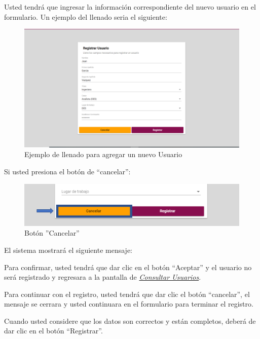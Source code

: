             Usted tendrá que ingresar la información correspondiente del nuevo usuario en el formulario. Un ejemplo del llenado seria el siguiente:
        
            \begin{figure}[!hbtp]
                \centering
                \hypertarget{ejreg}{\includegraphics[width=0.7\linewidth]{images/SP5/Registro-Usuario-Des}}
                \caption{Ejemplo de llenado para agregar un nuevo Usuario}
                \label{ejreg}
            \end{figure}
    
    \newpage
            Si usted presiona el botón de “cancelar”: 
            
            \begin{figure}[!hbtp]
                \centering
                \hypertarget{cancel1}{\includegraphics[width=0.7\linewidth]{images/SP5/BtnCancelar1}}
                \caption{Botón ''Cancelar''}
                \label{cancel1}
            \end{figure}
            
            El sistema mostrará el siguiente mensaje:

        
            Para confirmar, usted tendrá que dar clic en el botón “Aceptar” y el usuario no será registrado y regresara a la pantalla de \hyperlink{consultarUs}{\textit{Consultar Usuarios}}.
            
            Para continuar con el registro, usted tendrá que  dar clic el botón “cancelar”, el mensaje se cerrara y usted continuara en el formulario para terminar el registro.
            
            Cuando usted considere que los datos son correctos y están completos, deberá de dar clic en el botón “Registrar”.
            
